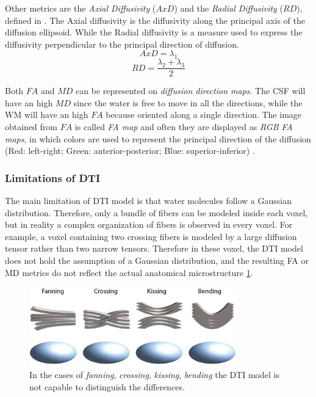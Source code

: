  Other metrics are the \emph{Axial Diffusivity} ($AxD$) and the \emph{Radial Diffusivity} ($RD$), defined in \cite{dtiBook}. The Axial diffusivity is the diffusivity along the principal axis of the diffusion ellipsoid. While the Radial diffusivity is a measure used to express the diffusivity perpendicular to the principal direction of diffusion.
 \begin{equation}
    AxD = \lambda_1
 \end{equation}
 \begin{equation}
    RD = \frac{\lambda_2+\lambda_3}{2}
 \end{equation}

 Both $FA$ and $MD$ can be represented on \emph{diffusion direction maps}. The CSF will have an high $MD$ since the water is free to move in all the directions, while the WM will have an high $FA$ because oriented along a single direction. The image obtained from $FA$ is called \emph{FA map} and often they are displayed as \emph{RGB FA maps}, in which colors are used to represent the principal direction of the diffusion (Red: left-right; Green: anterior-posterior; Blue: superior-inferior) .

  \subsubsection*{Limitations of DTI}
  The main limitation of DTI model is that water molecules follow a Gaussian distribution. Therefore, only a bundle of fibers can be modeled inside each voxel, but in reality a complex organization of fibers is observed in every voxel. For example, a voxel containing two crossing fibers is modeled by a large diffusion tensor rather than two narrow tensors. Therefore in these voxel, the DTI model does not hold the assumption of a Gaussian distribution, and the resulting FA or MD metrics do not reflect the actual anatomical microstructure \ref{fig:fiber_crossing}. \cite{elementiRisonanza}

  \begin{figure}[h]
      \centering
      \includegraphics[width=0.8\textwidth]{images/fiber_orientations.png}
      \caption{In the cases of \emph{fanning}, \emph{crossing}, \emph{kissing}, \emph{bending} the DTI model is not capable to distinguish the differences. \cite{elementiRisonanza}}
      \label{fig:fiber_crossing}
  \end{figure}
